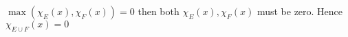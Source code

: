 \documentclass[preview]{standalone}
\begin{document}
\begin{center}
$\max(\chi_{E}(x),\chi_F(x)) = 0$ then both $\chi_{E}(x), \chi_{F}(x)$ must be zero. Hence $\chi_{E\cup F}(x)=0$
\end{center}
\end{document}
